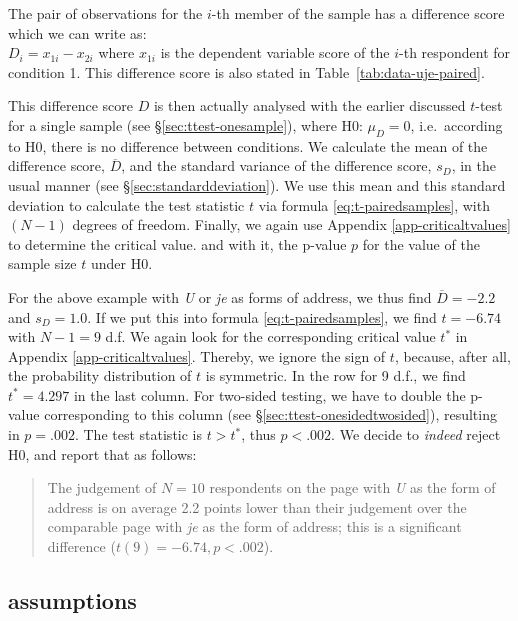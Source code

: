 \documentclass[
]{book}
\begin{document}
The pair of observations for the \(i\)-th member of the sample has a
difference score which we can write as:\\
\(D_i = x_{1i} - x_{2i}\) where \(x_{1i}\) is the dependent
variable score of the \(i\)-th respondent for condition 1. This
difference score is also stated in
Table~\ref{tab:data-uje-paired}.

This difference score \(D\) is then actually analysed with the earlier discussed \(t\)-test for a single sample (see §\ref{sec:ttest-onesample}), where H0: \(\mu_D=0\), i.e.~according to H0, there is no
difference between conditions. We calculate the mean of the difference score,
\(\overline{D}\), and the standard variance of the difference score, \(s_{D}\),
in the usual manner (see
§\ref{sec:standarddeviation}). We use this mean and this
standard deviation to calculate the test statistic \(t\) via formula
\eqref{eq:t-pairedsamples}, with \((N-1)\) degrees of freedom. Finally,
we again use
Appendix \ref{app-criticaltvalues} to determine the critical value.
and with it, the p-value \(p\) for the value of the sample size
\(t\) under H0.

For the above example with \emph{U} or \emph{je} as forms of address,
we thus find \(\overline{D}=-2.2\) and \(s_D=1.0\). If we put this into
formula \eqref{eq:t-pairedsamples}, we find \(t=-6.74\) with \(N-1=9\) d.f.
We again look for the corresponding critical value \(t^*\)
in Appendix \ref{app-criticaltvalues}. Thereby, we ignore the sign of \(t\),
because, after all, the probability distribution of \(t\) is symmetric.
In the row for 9 d.f., we find \(t^*=4.297\) in the last column.
For two-sided testing, we have to double the p-value corresponding to this
column (see
§\ref{sec:ttest-onesidedtwosided}), resulting in \(p=.002\).
The test statistic is \(t > t^*\), thus \(p<.002\). We decide to
\emph{indeed} reject H0, and report that as follows:

\begin{quote}
The judgement of \(N=10\) respondents on the page with \emph{U} as the
form of address is on average 2.2 points lower than their judgement
over the comparable page with \emph{je} as the form of address; this is
a significant difference (\(t(9)=-6.74, p<.002\)).
\end{quote}

\hypertarget{assumptions-1}{%
\subsection{assumptions}\label{assumptions-1}}
\end{document}
